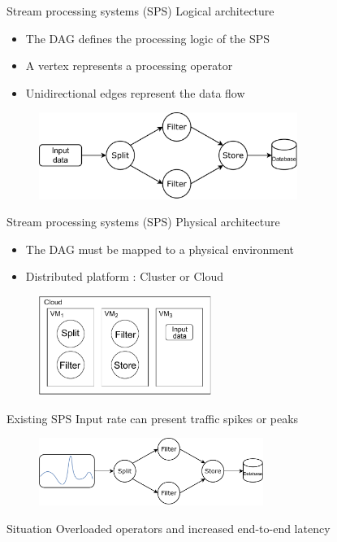 \begin{frame}{Stream processing systems (SPS)}
	Logical architecture
		\begin{itemize}
    		\item The DAG defines the processing logic of the SPS
    		\item A vertex represents a processing operator
    		\item Unidirectional edges represent the data flow
		\end{itemize}
    
    \begin{figure}
		\includegraphics[width=0.75\textwidth]{images/problems/SPS-Concept.pdf}
	\end{figure}
\end{frame}

\begin{frame}{Stream processing systems (SPS)}
	Physical architecture
		\begin{itemize}
    		\item The DAG  must be mapped to a physical environment
    		\item Distributed platform : Cluster or Cloud
		\end{itemize}
	
	\begin{figure}
		\includegraphics[width=0.5\textwidth]{images/problems/SPS-Physical.pdf}
	\end{figure}
\end{frame}

\begin{frame}{Existing SPS}
	Input rate can present traffic spikes or peaks

	\begin{figure}
		\includegraphics[width=0.65\textwidth]{images/problems/SPS-DynamicDataFlow.pdf}
	\end{figure}
	
	\pause
	
	\begin{alertblock}{Situation}
 	 Overloaded operators and increased end-to-end latency
	\end{alertblock}
\end{frame}

